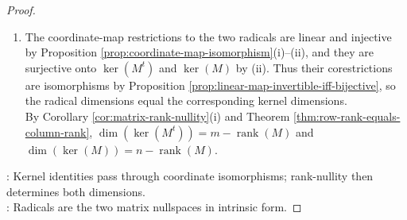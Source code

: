 \begin{proposition}
\begin{proof}
\begin{enumerate}[label=(\roman*)]
These equivalences prove both coordinate-set identities.
\item The coordinate-map restrictions to the two radicals are linear and injective by Proposition \ref{prop:coordinate-map-isomorphism}(i)--(ii), and they are surjective onto $\ker(M^t)$ and $\ker(M)$ by (ii). Thus their corestrictions are isomorphisms by Proposition \ref{prop:linear-map-invertible-iff-bijective}, so the radical dimensions equal the corresponding kernel dimensions.\\
By Corollary \ref{cor:matrix-rank-nullity}(i) and Theorem \ref{thm:row-rank-equals-column-rank}, $\dim(\ker(M^t))=m-\operatorname{rank}(M)$ and $\dim(\ker(M))=n-\operatorname{rank}(M)$.
\end{enumerate}
: Kernel identities pass through coordinate isomorphisms; rank-nullity then determines both dimensions.\\
: Radicals are the two matrix nullspaces in intrinsic form.
\end{proof}
\end{proposition}

